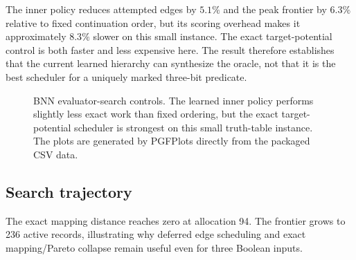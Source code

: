 The inner policy reduces attempted edges by $5.1\%$ and the peak frontier by $6.3\%$ relative to fixed continuation order, but its scoring overhead makes it approximately $8.3\%$ slower on this small instance.  The exact target-potential control is both faster and less expensive here.  The result therefore establishes that the current learned hierarchy can synthesize the oracle, not that it is the best scheduler for a uniquely marked three-bit predicate.

\begin{figure}[t]
\centering
{}
\caption{BNN evaluator-search controls.  The learned inner policy performs slightly less exact work than fixed ordering, but the exact target-potential scheduler is strongest on this small truth-table instance.  The plots are generated by PGFPlots directly from the packaged CSV data.}
\label{fig:oracle-controls}
\end{figure}

\subsection{Search trajectory}

The exact mapping distance reaches zero at allocation 94.  The frontier grows to 236 active records, illustrating why deferred edge scheduling and exact mapping/Pareto collapse remain useful even for three Boolean inputs.

